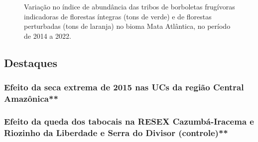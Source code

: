 \documentclass[
  letterpaper,
]{scrbook}
\begin{document}
\begin{figure}[H]


\caption{\label{fig-IA-mata-atlantica}Variação no índice de abundância
das tribos de borboletas frugívoras indicadoras de florestas íntegras
(tons de verde) e de florestas perturbadas (tons de laranja) no bioma
Mata Atlântica, no período de 2014 a 2022.}

\end{figure}%

\subsection{Destaques}\label{destaques-1}

\subsubsection{Efeito da seca extrema de 2015 nas UCs da região Central
Amazônica**}\label{efeito-da-seca-extrema-de-2015-nas-ucs-da-regiuxe3o-central-amazuxf4nica}

\subsubsection{Efeito da queda dos tabocais na RESEX Cazumbá-Iracema e
Riozinho da Liberdade e Serra do Divisor
(controle)**}\label{efeito-da-queda-dos-tabocais-na-resex-cazumbuxe1-iracema-e-riozinho-da-liberdade-e-serra-do-divisor-controle}
\end{document}
